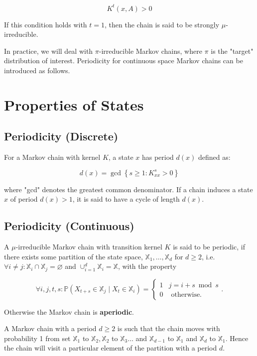 \documentclass[10pt]{article}
\begin{document}
$$
K^{t}(x, A)>0
$$

If this condition holds with $t=1$, then the chain is said to be strongly $\mu$-irreducible.

In practice, we will deal with $\pi$-irreducible Markov chains, where $\pi$ is the "target" distribution of interest. Periodicity for continuous space Markov chains can be introduced as follows.

\section{Properties of States}
\subsection{Periodicity (Discrete)}
For a Markov chain with kernel $K$, a state $x$ has period $d(x)$ defined as:

$$
d(x)=\operatorname{gcd}\left\{s \geq 1: K_{x x}^{s}>0\right\}
$$

where "gcd" denotes the greatest common denominator. If a chain induces a state $x$ of period $d(x)>1$, it is said to have a cycle of length $d(x)$.
\subsection{Periodicity (Continuous)}
A $\mu$-irreducible Markov chain with transition kernel $K$ is said to be periodic, if there exists some partition of the state space, $\mathbb{X}_{1}, \ldots, \mathbb{X}_{d}$ for $d \geq 2$, i.e. $\forall i \neq j: \mathbb{X}_{i} \cap \mathbb{X}_{j}=\varnothing$ and $\cup_{i=1}^{d} \mathbb{X}_{i}=\mathbb{X}$, with the property

$$
\forall i, j, t, s: \mathbb{P}\left(X_{t+s} \in \mathbb{X}_{j} \mid X_{t} \in \mathbb{X}_{i}\right)=\left\{\begin{array}{ll}
1 & j=i+s \bmod s \\
0 & \text { otherwise. }
\end{array} .\right.
$$

Otherwise the Markov chain is \textbf{aperiodic}.

A Markov chain with a period $d \geq 2$ is such that the chain moves with probability 1 from set $\mathbb{X}_{1}$ to $\mathbb{X}_{2}, \mathbb{X}_{2}$ to $\mathbb{X}_{3} \ldots$ and $\mathbb{X}_{d-1}$ to $\mathbb{X}_{1}$ and $\mathbb{X}_{d}$ to $\mathbb{X}_{1}$. Hence the chain will visit a particular element of the partition with a period $d$.
\end{document}
